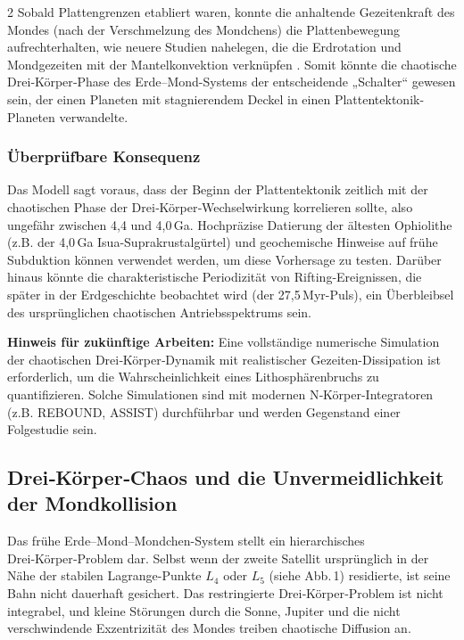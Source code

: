 \documentclass[11pt,a4paper]{article}
\begin{document}
\begin{multicols}{2}
		Sobald Plattengrenzen etabliert waren, konnte die anhaltende Gezeitenkraft des Mondes (nach der Verschmelzung des Mondchens) die Plattenbewegung aufrechterhalten, wie neuere Studien nahelegen, die die Erdrotation und Mondgezeiten mit der Mantelkonvektion verknüpfen \cite{Rampino2021}. Somit könnte die chaotische Drei‑Körper‑Phase des Erde–Mond-Systems der entscheidende „Schalter“ gewesen sein, der einen Planeten mit stagnierendem Deckel in einen Plattentektonik-Planeten verwandelte.
		
		\subsubsection{Überprüfbare Konsequenz}
		
		Das Modell sagt voraus, dass der Beginn der Plattentektonik zeitlich mit der chaotischen Phase der Drei‑Körper‑Wechselwirkung korrelieren sollte, also ungefähr zwischen 4,4 und 4,0 Ga. Hochpräzise Datierung der ältesten Ophiolithe (z.B. der 4,0 Ga Isua-Suprakrustalgürtel) und geochemische Hinweise auf frühe Subduktion können verwendet werden, um diese Vorhersage zu testen. Darüber hinaus könnte die charakteristische Periodizität von Rifting-Ereignissen, die später in der Erdgeschichte beobachtet wird (der 27,5 Myr-Puls), ein Überbleibsel des ursprünglichen chaotischen Antriebsspektrums sein.
		
		\vspace{0.2cm}
		\noindent
		\textbf{Hinweis für zukünftige Arbeiten:} Eine vollständige numerische Simulation der chaotischen Drei‑Körper‑Dynamik mit realistischer Gezeiten-Dissipation ist erforderlich, um die Wahrscheinlichkeit eines Lithosphärenbruchs zu quantifizieren. Solche Simulationen sind mit modernen N‑Körper-Integratoren (z.B. REBOUND, ASSIST) durchführbar und werden Gegenstand einer Folgestudie sein.
		
		
		\subsection{Drei‑Körper‑Chaos und die Unvermeidlichkeit der Mondkollision}
		
		Das frühe Erde–Mond–Mondchen-System stellt ein hierarchisches Drei‑Körper‑Problem dar.
		Selbst wenn der zweite Satellit ursprünglich in der Nähe der stabilen Lagrange-Punkte
		\(L_4\) oder \(L_5\) (siehe Abb. 1) residierte, ist seine Bahn nicht dauerhaft gesichert.
		Das restringierte Drei‑Körper‑Problem ist nicht integrabel, und kleine Störungen
		durch die Sonne, Jupiter und die nicht verschwindende Exzentrizität des Mondes treiben
		chaotische Diffusion an.
		

\end{multicols}
\end{document}
